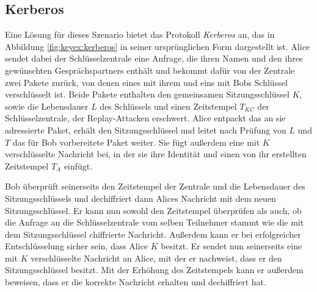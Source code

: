 \subsection{Kerberos}
Eine Lösung für dieses Szenario bietet das Protokoll \emph{Kerberos}
\indexKerberos an, das in Abbildung \ref{fig:keyex:kerberos} in seiner
ursprünglichen Form dargestellt ist. Alice sendet dabei der
Schlüsselzentrale eine Anfrage, die ihren Namen und den ihres
gewünschten Gesprächspartners enthält und bekommt dafür von der Zentrale
zwei Pakete zurück, von denen eines mit ihrem und eins mit Bobs
Schlüssel verschlüsselt ist. Beide Pakete enthalten den gemeinsamen
Sitzungsschlüssel $K$, sowie die Lebensdauer $L$ des Schlüssels und
einen Zeitstempel $T_{KC}$ der Schlüsselzentrale, der Replay-Attacken
erschwert.  Alice entpackt das an sie adressierte Paket, erhält den
Sitzungsschlüssel und leitet nach Prüfung von $L$ und $T$ das für Bob
vorbereitete Paket weiter. Sie fügt außerdem eine mit $K$ verschlüsselte
Nachricht bei, in der sie ihre Identität und einen von ihr erstellten
Zeitstempel $T_A$ einfügt.

Bob überprüft seinerseits den Zeitstempel der Zentrale und die
Lebensdauer des Sitzungsschlüssels und dechiffriert dann Alices
Nachricht mit dem neuen Sitzungsschlüssel. Er kann nun sowohl den
Zeitstempel überprüfen als auch, ob die Anfrage an die Schlüsselzentrale
vom selben Teilnehmer stammt wie die mit dem Sitzungsschlüssel
chiffrierte Nachricht. Außerdem kann er bei erfolgreicher
Entschlüsselung sicher sein, dass Alice $K$ besitzt. Er sendet nun
seinerseits eine mit $K$ verschlüsselte Nachricht an Alice, mit der er
nachweist, dass er den Sitzungsschlüssel besitzt. Mit der Erhöhung des
Zeitstempels kann er außerdem beweisen, dass er die korrekte Nachricht
erhalten und dechiffriert hat.

